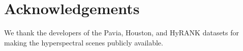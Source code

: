 \section*{Acknowledgements}
We thank the developers of the Pavia, Houston, and HyRANK datasets for making the hyperspectral scenes publicly available.
